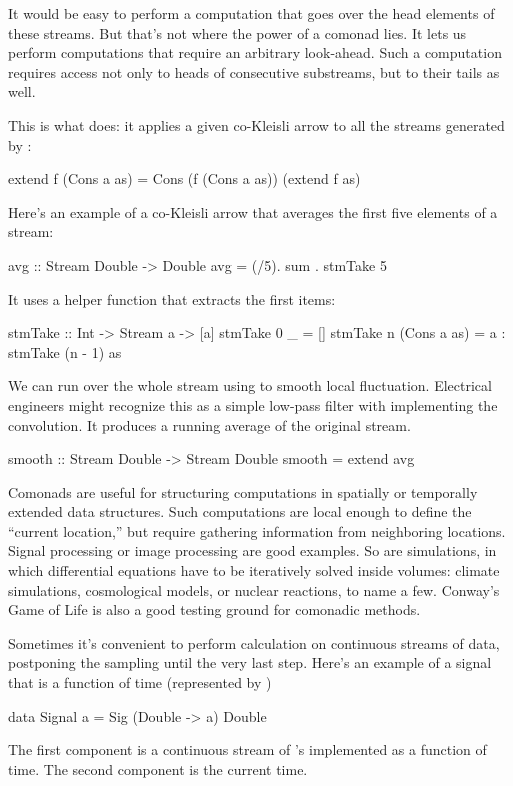 \documentclass[DaoFP]{subfiles}
\begin{document}
It would be easy to perform a computation that goes over the head elements of these streams. But that's not where the power of a comonad lies. It lets us perform computations that require an arbitrary look-ahead.  Such a computation requires access not only to heads of consecutive substreams, but to their tails as well.

This is what  does: it applies a given co-Kleisli arrow to all the streams generated by :
\begin{haskell}
  extend f (Cons a as) = Cons (f (Cons a as)) (extend f as)
\end{haskell}

Here's an example of a co-Kleisli arrow that averages the first five elements of a stream:
\begin{haskell}
avg :: Stream Double -> Double
avg  = (/5). sum . stmTake 5
\end{haskell}
It uses a helper function that extracts the first  items:
\begin{haskell}
stmTake :: Int -> Stream a -> [a]
stmTake 0 _ = []
stmTake n (Cons a as) = a : stmTake (n - 1) as
\end{haskell}

We can run  over the whole stream using  to smooth local fluctuation. Electrical engineers might recognize this as a simple low-pass filter with  implementing the convolution. It produces a running average of the original stream. 
\begin{haskell}
smooth :: Stream Double -> Stream Double
smooth = extend avg
\end{haskell}


Comonads are useful for structuring computations in spatially or temporally extended data structures. Such computations are local enough to define the ``current location,'' but require gathering information from neighboring locations. Signal processing or image processing are good examples. So are simulations, in which differential equations have to be iteratively solved inside volumes: climate simulations, cosmological models, or nuclear reactions, to name a few. Conway's Game of Life is also a good testing ground for comonadic methods.

Sometimes it's convenient to perform calculation on continuous streams of data, postponing the sampling until the very last step. Here's an example of a signal that is a function of time (represented by )
\begin{haskell}
data Signal a = Sig (Double -> a) Double
\end{haskell}
The first component is a continuous stream of 's implemented as a function of time. The second component is the current time.
\end{document}
